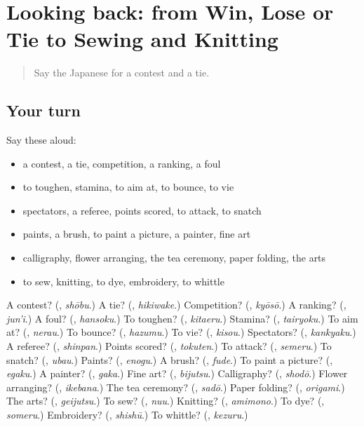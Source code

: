 \section[(dialogue)]{Looking back: from Win, Lose or Tie to Sewing and Knitting}

\label{lesson:JA-R467-review-462-467}



\begin{quote}
Say the Japanese for a contest and a tie.
\end{quote}

\subsection*{Your turn}
Say these aloud:

\begin{itemize}
\raggedright
  \item a contest, a tie, competition, a ranking, a foul
  \item to toughen, stamina, to aim at, to bounce, to vie
  \item spectators, a referee, points scored, to attack, to snatch
  \item paints, a brush, to paint a picture, a painter, fine art
  \item calligraphy, flower arranging, the tea ceremony, paper folding, the arts
  \item to sew, knitting, to dye, embroidery, to whittle
\end{itemize}

\begin{tcolorbox}[breakable,colback=teal!4,colframe=teal!35!black,title={Before you move on}]
A contest? (\textbf{}, \emph{shōbu}.) A tie? (\textbf{}, \emph{hikiwake}.) Competition? (\textbf{}, \emph{kyōsō}.) A ranking? (\textbf{}, \emph{jun'i}.) A foul? (\textbf{}, \emph{hansoku}.) To toughen? (\textbf{}, \emph{kitaeru}.) Stamina? (\textbf{}, \emph{tairyoku}.) To aim at? (\textbf{}, \emph{nerau}.) To bounce? (\textbf{}, \emph{hazumu}.) To vie? (\textbf{}, \emph{kisou}.) Spectators? (\textbf{}, \emph{kankyaku}.) A referee? (\textbf{}, \emph{shinpan}.) Points scored? (\textbf{}, \emph{tokuten}.) To attack? (\textbf{}, \emph{semeru}.) To snatch? (\textbf{}, \emph{ubau}.) Paints? (\textbf{}, \emph{enogu}.) A brush? (\textbf{}, \emph{fude}.) To paint a picture? (\textbf{}, \emph{egaku}.) A painter? (\textbf{}, \emph{gaka}.) Fine art? (\textbf{}, \emph{bijutsu}.) Calligraphy? (\textbf{}, \emph{shodō}.) Flower arranging? (\textbf{}, \emph{ikebana}.) The tea ceremony? (\textbf{}, \emph{sadō}.) Paper folding? (\textbf{}, \emph{origami}.) The arts? (\textbf{}, \emph{geijutsu}.) To sew? (\textbf{}, \emph{nuu}.) Knitting? (\textbf{}, \emph{amimono}.) To dye? (\textbf{}, \emph{someru}.) Embroidery? (\textbf{}, \emph{shishū}.) To whittle? (\textbf{}, \emph{kezuru}.)
\end{tcolorbox}
